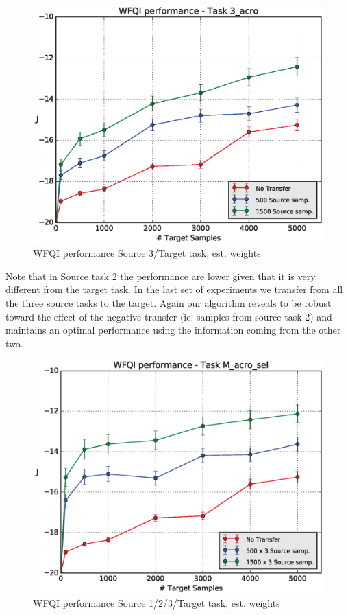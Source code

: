     \begin{figure}[H]
      \raggedbottom
      \centering
      \includegraphics[scale=0.5]{images/WFQIPerf3_acro.eps}
      \caption{WFQI performance Source 3/Target task, est. weights}
      \label{acro3}
    \end{figure}

    \noindent Note that in Source task 2 the performance are lower given that it is very different from the
    target task.\newline
    In the last set of experiments we transfer from all the three source tasks to the target. Again our algorithm
    reveals to be robust toward the effect of the negative transfer (ie. samples from source task 2) and maintains
    an optimal performance using the information coming from the other two.

    \begin{figure}[H]
      \raggedbottom
      \centering
      \includegraphics[scale=0.5]{images/WFQIPerfM_acro.eps}
      \caption{WFQI performance Source 1/2/3/Target task, est. weights}
      \label{acro3}
    \end{figure}

